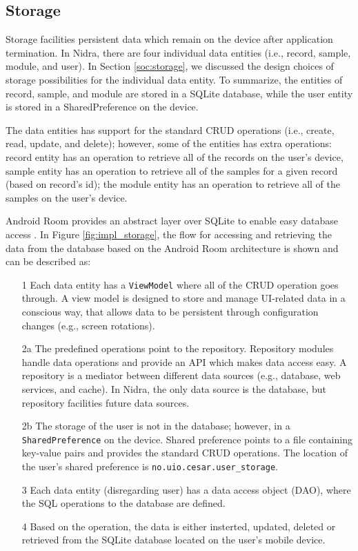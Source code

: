 \subsection{Storage}\label{ioc:storage}

Storage facilities persistent data which remain on the device after application termination. In Nidra, there are four individual data entities (i.e., record, sample, module, and user). In Section \ref{soc:storage}, we discussed the design choices of storage possibilities for the individual data entity. To summarize, the entities of record, sample, and module are stored in a SQLite database, while the user entity is stored in a SharedPreference on the device.

The data entities has support for the standard CRUD operations (i.e., create, read, update, and delete); however, some of the entities has extra operations: record entity has an operation to retrieve all of the records on the user's device, sample entity has an operation to retrieve all of the samples for a given record (based on record's id); the module entity has an operation to retrieve all of the samples on the user's device.

Android Room provides an abstract layer over SQLite to enable easy database access \cite{room}. In Figure \ref{fig:impl_storage}, the flow for accessing and retrieving the data from the database based on the Android Room architecture is shown and can be described as:

\begin{itemize}
    \item[1] Each data entity has a \verb|ViewModel| where all of the CRUD operation goes through.  A view model is designed to store and manage UI-related data in a conscious way, that allows data to be persistent through configuration changes (e.g., screen rotations). 
     \item[2a] The predefined operations point to the repository. Repository modules handle data operations and provide an API  which makes data access easy. A repository is a mediator between different data sources (e.g., database, web services, and cache). In Nidra, the only data source is the database, but repository facilities future data sources. 
    \item[2b] The storage of the user is not in the database; however, in a \verb|SharedPreference| on the device. Shared preference points to a file containing key-value pairs and provides the standard CRUD operations. The location of the user's shared preference is \verb|no.uio.cesar.user_storage|. 
    \item[3] Each data entity (disregarding user) has a data access object (DAO), where the SQL operations to the database are defined. 
    \item[4] Based on the operation, the data is either insterted, updated, deleted or retrieved from the SQLite database located on the user's mobile device. 
\end{itemize}

